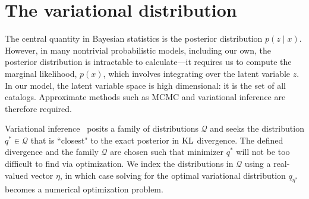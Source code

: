 \section{The variational distribution}
\label{sec:var_inference}

The central quantity in Bayesian statistics is the posterior distribution $p(z\mid x)$.
However, in many
nontrivial probabilistic models, including our own, the posterior distribution is intractable to calculate---it requires us to compute the marginal likelihood, $p(x)$, which involves integrating over the latent variable $z$.
In our model, the latent variable space is high dimensional: it is the set of all catalogs. Approximate methods such as MCMC and variational inference are therefore required.

Variational inference~\citep{Jordan_intro_vi, Wainwrite_graph_models_vi, Blei_2017_vi_review} posits a family of distributions $\mathcal{Q}$ and seeks
the distribution $q^*\in \mathcal{Q}$ that is ``closest" to the exact posterior in $\textrm{KL}$ divergence.
The defined divergence and the family $\mathcal{Q}$ are chosen such that minimizer $q^*$ will
not be too difficult to find via optimization.
We index the distributions in $\mathcal{Q}$ using a real-valued vector $\eta$, in which
case solving for the optimal variational distribution $q_{\eta^*}$
becomes a numerical optimization problem.

